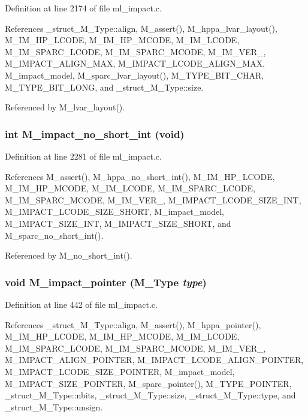 Definition at line 2174 of file ml\_\-impact.c.

References \_\-struct\_\-M\_\-Type::align, M\_\-assert(), M\_\-hppa\_\-lvar\_\-layout(), M\_\-IM\_\-HP\_\-LCODE, M\_\-IM\_\-HP\_\-MCODE, M\_\-IM\_\-LCODE, M\_\-IM\_\-SPARC\_\-LCODE, M\_\-IM\_\-SPARC\_\-MCODE, M\_\-IM\_\-VER\_, M\_\-IMPACT\_\-ALIGN\_\-MAX, M\_\-IMPACT\_\-LCODE\_\-ALIGN\_\-MAX, M\_\-impact\_\-model, M\_\-sparc\_\-lvar\_\-layout(), M\_\-TYPE\_\-BIT\_\-CHAR, M\_\-TYPE\_\-BIT\_\-LONG, and \_\-struct\_\-M\_\-Type::size.

Referenced by M\_\-lvar\_\-layout().
\subsubsection{\setlength{\rightskip}{0pt plus 5cm}int M\_\-impact\_\-no\_\-short\_\-int (void)}\label{ml__impact_8c_44be82987adbaf2e3dbabec49ffb4ffe}




Definition at line 2281 of file ml\_\-impact.c.

References M\_\-assert(), M\_\-hppa\_\-no\_\-short\_\-int(), M\_\-IM\_\-HP\_\-LCODE, M\_\-IM\_\-HP\_\-MCODE, M\_\-IM\_\-LCODE, M\_\-IM\_\-SPARC\_\-LCODE, M\_\-IM\_\-SPARC\_\-MCODE, M\_\-IM\_\-VER\_, M\_\-IMPACT\_\-LCODE\_\-SIZE\_\-INT, M\_\-IMPACT\_\-LCODE\_\-SIZE\_\-SHORT, M\_\-impact\_\-model, M\_\-IMPACT\_\-SIZE\_\-INT, M\_\-IMPACT\_\-SIZE\_\-SHORT, and M\_\-sparc\_\-no\_\-short\_\-int().

Referenced by M\_\-no\_\-short\_\-int().
\subsubsection{\setlength{\rightskip}{0pt plus 5cm}void M\_\-impact\_\-pointer (\bf{M\_\-Type} {\em type})}\label{ml__impact_8c_31e92222e58968dbe9347df025cab8a9}




Definition at line 442 of file ml\_\-impact.c.

References \_\-struct\_\-M\_\-Type::align, M\_\-assert(), M\_\-hppa\_\-pointer(), M\_\-IM\_\-HP\_\-LCODE, M\_\-IM\_\-HP\_\-MCODE, M\_\-IM\_\-LCODE, M\_\-IM\_\-SPARC\_\-LCODE, M\_\-IM\_\-SPARC\_\-MCODE, M\_\-IM\_\-VER\_, M\_\-IMPACT\_\-ALIGN\_\-POINTER, M\_\-IMPACT\_\-LCODE\_\-ALIGN\_\-POINTER, M\_\-IMPACT\_\-LCODE\_\-SIZE\_\-POINTER, M\_\-impact\_\-model, M\_\-IMPACT\_\-SIZE\_\-POINTER, M\_\-sparc\_\-pointer(), M\_\-TYPE\_\-POINTER, \_\-struct\_\-M\_\-Type::nbits, \_\-struct\_\-M\_\-Type::size, \_\-struct\_\-M\_\-Type::type, and \_\-struct\_\-M\_\-Type::unsign.

